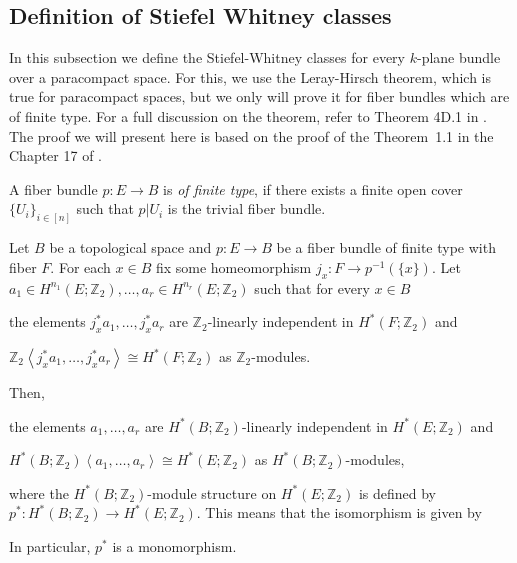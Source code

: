 \subsection{Definition of Stiefel Whitney classes}
In this subsection we define the Stiefel-Whitney classes for every $k$-plane bundle over a paracompact space. For this, we use the Leray-Hirsch theorem, which is true for paracompact spaces, but we only will prove it for fiber bundles which are of finite type. For a full discussion on the theorem, refer to Theorem 4D.1 in \cite{hatcher}. The proof we will present here is based on the proof of the Theorem~1.1 in the Chapter 17 of \cite{husemoller}.
\begin{definition} A fiber bundle $p:E\to B$ is \emph{of finite type}, if there exists a finite open cover $\{U_i\}_{i\in[n]}$ such that $p|U_i$ is the trivial fiber bundle.
\end{definition}
\begin{theorem}\label{thm:leray_hirsch} Let $B$ be a topological space and $p:E\to B$ be a fiber bundle of finite type with fiber $F$. For each $x\in B$ fix some homeomorphism $j_x:F\to p^{-1}(\{x\})$. Let $a_1\in H^{n_1}(E;\mathbb{Z}_2),\ldots,a_r\in H^{n_r}(E;\mathbb{Z}_2)$ such that for every $x\in B$
\begin{b_item}
\item the elements $j_x^*a_1,\ldots,j_x^*a_r$ are $\mathbb{Z}_2$-linearly independent in $H^*(F;\mathbb{Z}_2)$ and
\item $\mathbb{Z}_2\left<j_x^*a_1,\ldots,j_x^*a_r\right>\cong H^*(F;\mathbb{Z}_2)$ as $\mathbb{Z}_2$-modules.
\end{b_item}
Then,
\begin{b_item}
\item the elements $a_1,\ldots,a_r$ are $H^*(B;\mathbb{Z}_2)$-linearly independent in $H^*(E;\mathbb{Z}_2)$ and
\item $H^*(B;\mathbb{Z}_2)\left<a_1,\ldots,a_r\right>\cong H^*(E;\mathbb{Z}_2)$ as $H^*(B;\mathbb{Z}_2)$-modules,
\end{b_item}
where the $H^*(B;\mathbb{Z}_2)$-module structure on $H^*(E;\mathbb{Z}_2)$ is defined by $p^*:H^*(B;\mathbb{Z}_2)\to H^*(E;\mathbb{Z}_2)$. This means that the isomorphism is given by
\begin{center}
\end{center}
In particular, $p^*$ is a monomorphism.
\end{theorem}
